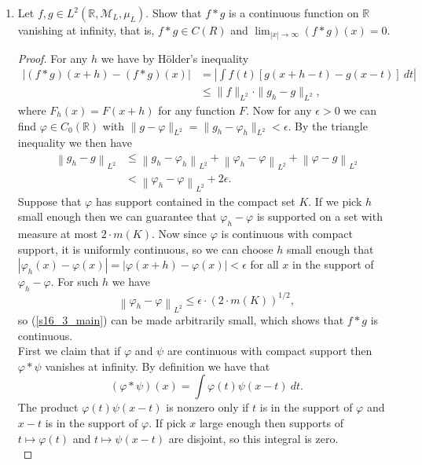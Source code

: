 \documentclass[11pt,letterpaper]{report}
\newcommand{\reals}{\mathbb{R}}
\newcommand{\mcal}[1]{\mathcal{#1}}
\newcommand{\Lp}[2]{\left\|{#1}\right\|_{L^{#2}}}
\newenvironment{solution}
{\begin{proof}[Solution]}
{\end{proof}}
\begin{document}
\begin{enumerate}
\begin{solution}
		For almost all $x$, if $I_k$ is a sequence of intervals shrinking to $x$ then
		\begin{align*}
		\frac{1}{m(I_k)}\int_{I_k}f\ dx &= \frac{1}{m(I_k)}\int f\chi_{I_k}\ dx\\
		&= \lim_{n\to \infty}\frac{1}{m(I_k)}\int f_n\chi_{I_k}\ dx.
		\end{align*}
		Since $0\leq f_n\leq 1$, the RHS is in $[0, 1]$ for almost all $x$. By the Lebesgue differentiation theorem we then have that $0\leq f\leq 1$ a.e.
	\end{solution}

	\item Let $f,g\in L^2(\reals, \mcal{M}_L, \mu_L)$. Show that $f*g$ is a continuous function on $\reals$ vanishing at infinity, that is, $f*g\in C(R)$ and $\lim_{|x|\to \infty}(f*g)(x) = 0$.
	\begin{proof}
		For any $h$ we have by H\"older's inequality
		\begin{align}\label{s16_3_main}
			|(f*g)(x+h)-(f*g)(x)| &= \left|\int f(t)[g(x+h-t) - g(x-t)]\ dt\right|\\
			&\leq \|f\|_{L^2}\cdot \|g_h-g\|_{L^2},
		\end{align}
		where $F_h(x) = F(x+h)$ for any function $F$. Now for any $\epsilon>0$ we can find $\varphi\in C_0(\reals)$ with $\|g-\varphi\|_{L^2} = \|g_h-\varphi_h\|_{L^2} <\epsilon$. By the triangle inequality we then have
		\begin{align*}
		\Lp{g_h-g}{2} &\leq \Lp{g_h-\varphi_h}{2} + \Lp{\varphi_h-\varphi}{2} +\Lp{\varphi-g}{2}\\
		&< \Lp{\varphi_h-\varphi}{2} + 2\epsilon.
		\end{align*}
		Suppose that $\varphi$ has support contained in the compact set $K$. If we pick $h$ small enough then we can guarantee that $\varphi_h-\varphi$ is supported on a set with measure at most $2\cdot m(K)$. Now since $\varphi$ is continuous with compact support, it is uniformly continuous, so we can choose $h$ small enough that $|\varphi_h(x)-\varphi(x)| = |\varphi(x+h)-\varphi(x)|<\epsilon$ for all $x$ in the support of $\varphi_h-\varphi$. For such $h$ we have
		\[
		\Lp{\varphi_h-\varphi}{2} \leq \epsilon \cdot (2\cdot m(K))^{1/2},
		\]
		so (\ref{s16_3_main}) can be made arbitrarily small, which shows that $f*g$ is continuous.\\

		\noindent First we claim that if $\varphi$ and $\psi$ are continuous with compact support then $\varphi*\psi$ vanishes at infinity. By definition we have that
		\[
		(\varphi*\psi)(x) = \int\varphi(t)\psi(x-t)\ dt.
		\]
		The product $\varphi(t)\psi(x-t)$ is nonzero only if $t$ is in the support of $\varphi$ and $x-t$ is in the support of $\varphi$. If pick $x$ large enough then supports of $t\mapsto \varphi(t)$ and $t\mapsto \psi(x-t)$ are disjoint, so this integral is zero.\\


\end{proof}
\end{enumerate}
\end{document}
